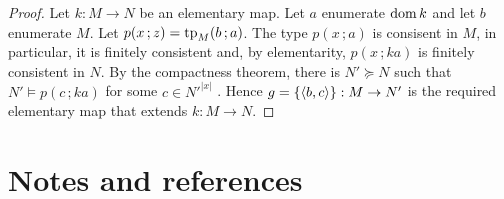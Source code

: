 \documentclass[creche.tex]{subfiles}
\begin{document}
\begin{proof}
Let $k:M\to N$ be an elementary map. Let $a$ enumerate $\mathop{\rm dom} k$ and let $b$ enumerate $M$. Let $p(x\,;z)={\rm tp}_M(b\,;a)$. The type $p(x\,;a)$ is consisent in $M$, in particular, it is finitely consistent and, by elementarity,  $p(x\,;ka)$ is finitely consistent in $N$. By the compactness theorem, there is $N'\succeq N$ such that $N'\models p(c\,;ka)$ for some $c\in N'^{|x|}$ . Hence $g=\{\langle b,c\rangle\}:M\to N'$ is the required elementary map that extends $k:M\to N$.
\end{proof}
\section{Notes and references}
\begin{biblist}[]\normalsize

   

\end{biblist}
\end{document}
